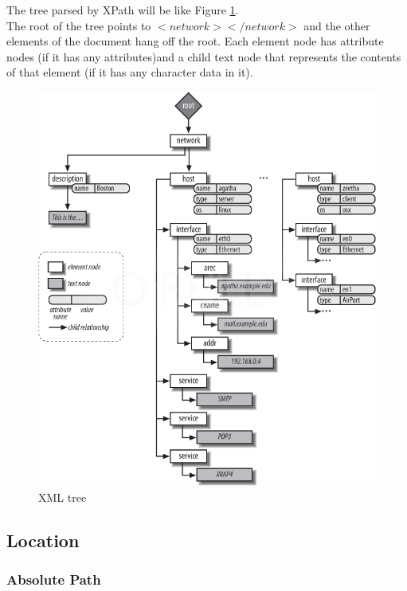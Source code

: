 The tree parsed by XPath will be like Figure \ref{graf:xml-tree}.\\

The root of the tree points to $<network></network>$  and the other elements of the document hang off the root. Each element node has attribute nodes (if it has any attributes)and a child text node that represents the contents of that element (if it has any character data in it). \cite{Blank-Edelm} \\

\begin{figure}[ht!]
   \centering
   \includegraphics[scale=0.6]{imgs/xml-tree.png}
   \caption{XML tree}\label{graf:xml-tree}
\end{figure}

\newpage

\subsection{Location}

\subsubsection{Absolute Path}


